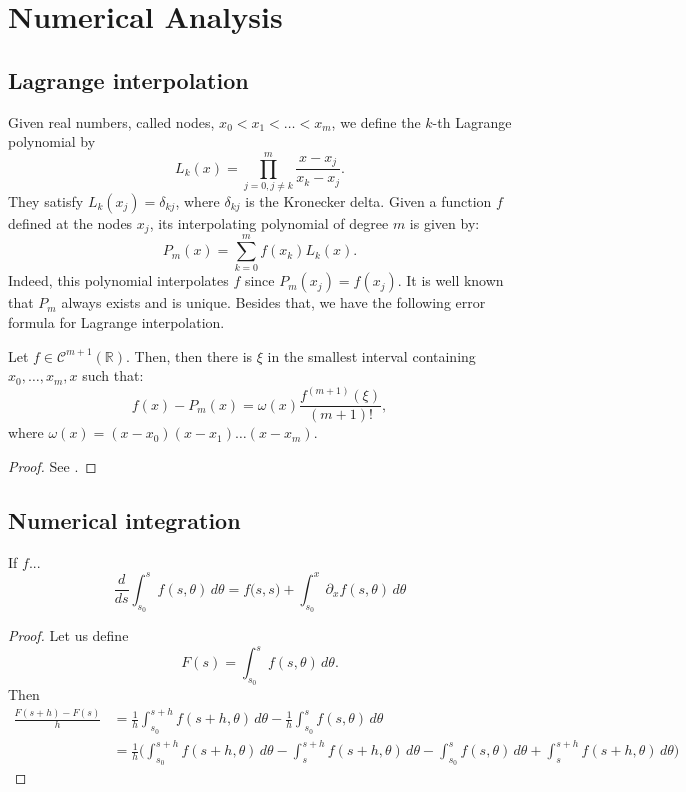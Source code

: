 \chapter{Numerical Analysis}
\label{anexo-na}

\section{Lagrange interpolation}
\label{anexo-interp}
Given real numbers, called nodes, $x_0< x_1 < \ldots< x_m$, we define the $k$-th Lagrange polynomial by
\begin{equation*}
	L_k(x) = \prod_{j=0, j \neq k}^{m}\frac{x-x_j}{x_k-x_j}.
\end{equation*}
They satisfy $L_k(x_j) = \delta_{kj}$, where  $\delta_{kj}$ is the Kronecker delta.
Given a function $f$ defined at the nodes $x_j$, its interpolating polynomial of 
degree $m$ is given by:
\begin{equation*}
	P_m(x) = \sum_{k=0}^{m} f(x_k)L_k(x).
\end{equation*}
Indeed, this polynomial interpolates $f$ since $P_m(x_j) = f(x_j)$.
It is well known that $P_m$ always exists and is unique. Besides that, we have the following error formula
for Lagrange interpolation.
\begin{thrm}
	\label{anexo-interp-error1}
	Let $f \in \mathcal{C}^{m+1}(\mathbb{R})$.
	Then, then there is $\xi$ in the smallest interval containing $x_0, \ldots, x_m, x$ such that:
	\begin{equation}
		f(x)-P_m(x) = \omega(x)\frac{f^{(m+1)}(\xi)}{(m+1)!},
	\end{equation}
	where $\omega(x) = (x-x_0)(x-x_1) \ldots (x-x_m)$.
\end{thrm}
\begin{proof}
	See \citet[Theorem~2.1.4.1. on \pno~49]{stoer:2002}.
\end{proof}

\section{Numerical integration}
\label{anexo-numint}
\begin{thrm}
	\label{anexo-numint-lr}
   If $f$...
	\begin{equation*}
	\frac{d}{ds}\int_{s_0}^{s}f(s,\theta) \,d\theta =
   f\big(s, s\big)+
	\int_{s_0}^{x}\partial_x f(s,\theta) \,d\theta
	\end{equation*}
\end{thrm}
\begin{proof}
Let us define
\begin{equation*}
F(s) = \int_{s_0}^{s}f(s,\theta) \,d\theta.
\end{equation*}
Then
\begin{align*}
\frac{F(s+h)-F(s)}{h} &= 
\frac{1}{h} \int_{s_0}^{s+h}f(s+h,\theta) \,d\theta - 
\frac{1}{h} \int_{s_0}^{s}f(s,\theta) \,d\theta \\
&= \frac{1}{h} \bigg(
 \int_{s_0}^{s+h}f(s+h,\theta) \,d\theta 
-\int_{s}^{s+h}f(s+h,\theta) \,d\theta 
-\int_{s_0}^{s}f(s,\theta) \,d\theta
+\int_{s}^{s+h}f(s+h,\theta) \,d\theta \bigg)
\end{align*}
\end{proof}


